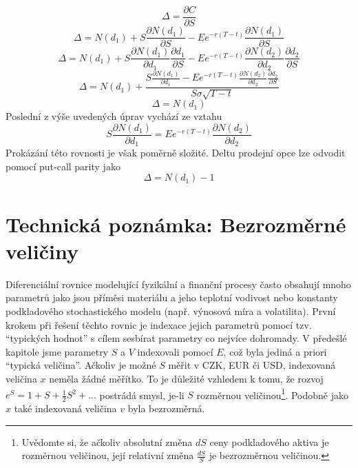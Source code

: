 \documentclass[a4paper]{book}
\begin{document}
\begin{equation*}
\Delta = \frac{\partial C}{\partial S}
\end{equation*}
\begin{equation*}
\Delta = N(d_1) + S \frac{\partial N(d_1)}{\partial S} - Ee^{-r(T-t)}\frac{\partial N(d_1)}{\partial S}
\end{equation*}
\begin{equation*}
\Delta = N(d_1) + S \frac{\partial N(d_1)}{\partial d_1}\frac{\partial d_1}{\partial S} - Ee^{-r(T-t)}\frac{\partial N(d_2)}{\partial d_2}\frac{\partial d_2}{\partial S}
\end{equation*}
\begin{equation*}
\Delta = N(d_1) + \frac{S \frac{\partial N(d_1)}{\partial d_1} - Ee^{-r(T-t)}\frac{\partial N(d_2)}{\partial d_2} \frac{\partial d_2}{\partial S}}{S \sigma \sqrt{T - t}}
\end{equation*}
\begin{equation*}
\Delta = N(d_1)
\end{equation*}
Poslední z výše uvedených úprav vychází ze vztahu
\begin{equation*}
S \frac{\partial N(d_1)}{\partial d_1} = Ee^{-r(T-t)}\frac{\partial N(d_2)}{\partial d_2}
\end{equation*}
Prokázání této rovnosti je však poměrně složité. Deltu prodejní opce lze odvodit pomocí put-call parity jako
\begin{equation*}
\Delta = N(d_1) - 1
\end{equation*}

\section{Technická poznámka: Bezrozměrné veličiny}

Diferenciální rovnice modelující fyzikální a finanční procesy často obsahují mnoho parametrů jako jsou příměsi materiálu a jeho teplotní vodivost nebo konstanty podkladového stochastického modelu (např. výnosová míra a volatilita). První krokem při řešení těchto rovnic je indexace jejich parametrů pomocí tzv. ``typických hodnot'' s cílem sesbírat parametry co nejvíce dohromady. V předešlé kapitole jsme parametry $S$ a $V$ indexovali pomocí $E$, což byla jediná a priori ``typická veličina''. Ačkoliv je možné $S$ měřit v CZK, EUR či USD, indexovaná veličina $x$ neměla žádné měřítko. To je důležité vzhledem k tomu, že rozvoj $e^S = 1 + S + \frac{1}{2}S^2 + ...$ postrádá smysl, je-li $S$ rozměrnou veličinou\footnote{Uvědomte si, že ačkoliv absolutní změna $dS$ ceny podkladového aktiva je rozměrnou veličinou, její relativní změna $\frac{dS}{S}$ je bezrozměrnou veličinou.}. Podobně jako $x$ také indexovaná veličina $v$ byla bezrozměrná.
\end{document}
